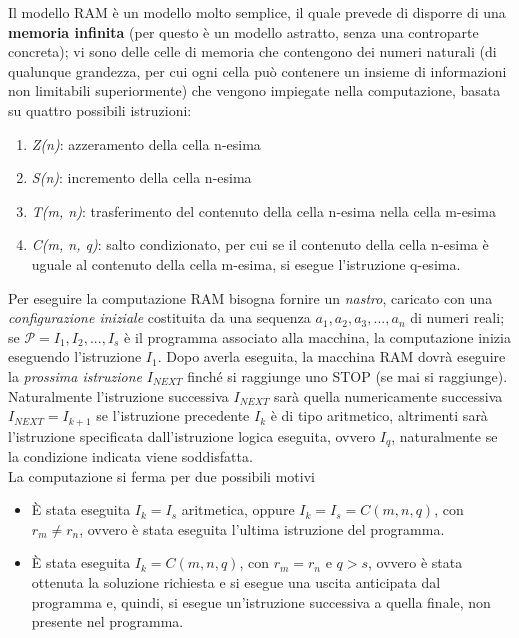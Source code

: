 \documentclass[a4paper]{extarticle}
\begin{document}
\vspace{1em}
\noindent
Il modello RAM è un modello molto semplice, il quale prevede di disporre di una \textbf{memoria infinita} (per questo è un modello astratto, senza una controparte concreta); vi sono delle celle di memoria che contengono dei numeri naturali (di qualunque grandezza, per cui ogni cella può contenere un insieme di informazioni non limitabili superiormente) che vengono impiegate nella computazione, basata su quattro possibili istruzioni:
\begin{enumerate}
    \item \textit{Z(n)}: azzeramento della cella n-esima
    \item \textit{S(n)}: incremento della cella n-esima
    \item \textit{T(m, n)}: trasferimento del contenuto della cella n-esima nella cella m-esima
    \item \textit{C(m, n, q)}: salto condizionato, per cui se il contenuto della cella n-esima è uguale al contenuto della cella m-esima, si esegue l'istruzione q-esima.
\end{enumerate}
Per eseguire la computazione RAM bisogna fornire un \textit{nastro}, caricato con una \textit{configurazione iniziale} costituita da una sequenza \(a_1, a_2,a_3, ..., a_n\) di numeri reali; se \(\mathcal{P} = I_1, I_2, ..., I_s\) è il programma associato alla macchina, la computazione inizia eseguendo l'istruzione \(I_1\). Dopo averla eseguita, la macchina RAM dovrà eseguire la \textit{prossima istruzione} \(I_{\textit{NEXT}}\) finché si raggiunge uno STOP (se mai si raggiunge).\\
Naturalmente l'istruzione successiva \(I_{\textit{NEXT}}\) sarà quella numericamente successiva \(I_{\textit{NEXT}} = I_{k + 1}\) se l'istruzione precedente \(I_k\) è di tipo aritmetico, altrimenti sarà l'istruzione specificata dall'istruzione logica eseguita, ovvero \(I_q\), naturalmente se la condizione indicata viene soddisfatta.\\
La computazione si ferma per due possibili motivi
\begin{itemize}
    \item È stata eseguita \(I_k = I_s\) aritmetica, oppure \(I_k = I_s = C(m, n, q)\), con \(r_m \neq r_n\), ovvero è stata eseguita l'ultima istruzione del programma.
    \item È stata eseguita \(I_k = C(m, n, q)\), con \(r_m = r_n\) e \(q > s\), ovvero è stata ottenuta la soluzione richiesta e si esegue una uscita anticipata dal programma e, quindi, si esegue un'istruzione successiva a quella finale, non presente nel programma.
\end{itemize}
\end{document}
